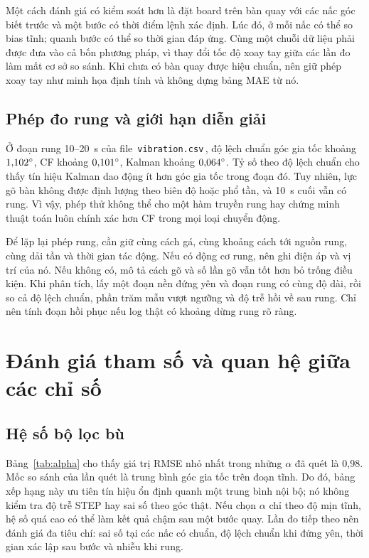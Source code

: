 Một cách đánh giá có kiểm soát hơn là đặt board trên bàn quay với các nấc góc biết trước và một bước có thời điểm lệnh xác định. Lúc đó, ở mỗi nấc có thể so bias tĩnh; quanh bước có thể so thời gian đáp ứng. Cùng một chuỗi dữ liệu phải được đưa vào cả bốn phương pháp, vì thay đổi tốc độ xoay tay giữa các lần đo làm mất cơ sở so sánh. Khi chưa có bàn quay được hiệu chuẩn, nên giữ phép xoay tay như minh họa định tính và không dựng bảng MAE từ nó.

\subsection{Phép đo rung và giới hạn diễn giải}
Ở đoạn rung 10--20~s của file \,\texttt{vibration.csv}\,, độ lệch chuẩn góc gia tốc khoảng $1{,}102^{\circ}$, CF khoảng $0{,}101^{\circ}$, Kalman khoảng $0{,}064^{\circ}$. Tỷ số theo độ lệch chuẩn cho thấy tín hiệu Kalman dao động ít hơn góc gia tốc trong đoạn đó. Tuy nhiên, lực gõ bàn không được định lượng theo biên độ hoặc phổ tần, và 10~s cuối vẫn có rung. Vì vậy, phép thử không thể cho một hàm truyền rung hay chứng minh thuật toán luôn chính xác hơn CF trong mọi loại chuyển động.

Để lặp lại phép rung, cần giữ cùng cách gá, cùng khoảng cách tới nguồn rung, cùng dải tần và thời gian tác động. Nếu có động cơ rung, nên ghi điện áp và vị trí của nó. Nếu không có, mô tả cách gõ và số lần gõ vẫn tốt hơn bỏ trống điều kiện. Khi phân tích, lấy một đoạn nền đứng yên và đoạn rung có cùng độ dài, rồi so cả độ lệch chuẩn, phần trăm mẫu vượt ngưỡng và độ trễ hồi về sau rung. Chỉ nên tính đoạn hồi phục nếu log thật có khoảng dừng rung rõ ràng.

\section{Đánh giá tham số và quan hệ giữa các chỉ số}
\subsection{Hệ số bộ lọc bù}
Bảng~\ref{tab:alpha} cho thấy giá trị RMSE nhỏ nhất trong những $\alpha$ đã quét là 0,98. Mốc so sánh của lần quét là trung bình góc gia tốc trên đoạn tĩnh. Do đó, bảng xếp hạng này ưu tiên tín hiệu ổn định quanh một trung bình nội bộ; nó không kiểm tra độ trễ STEP hay sai số theo góc thật. Nếu chọn $\alpha$ chỉ theo độ mịn tĩnh, hệ số quá cao có thể làm kết quả chậm sau một bước quay. Lần đo tiếp theo nên đánh giá đa tiêu chí: sai số tại các nấc có chuẩn, độ lệch chuẩn khi đứng yên, thời gian xác lập sau bước và nhiễu khi rung.


